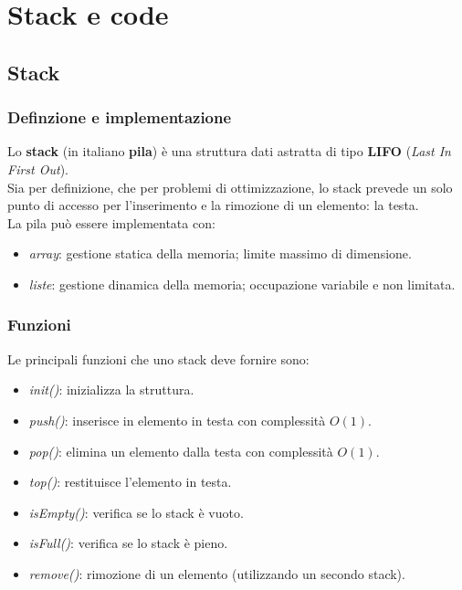 \chapter{Stack e code}

\section{Stack}
\subsection{Definzione e implementazione}
Lo \textbf{stack} (in italiano \textbf{pila}) è una struttura dati astratta di tipo \textbf{LIFO} (\textit{Last In First Out}).\\
Sia per definizione, che per problemi di ottimizzazione, lo stack prevede un solo punto di accesso per l'inserimento e la rimozione di un elemento: la testa.\\
La pila può essere implementata con:
\begin{itemize}[noitemsep, nolistsep]
	\item \textit{array}: gestione statica della memoria; limite massimo di dimensione.
	\item \textit{liste}: gestione dinamica della memoria; occupazione variabile e non limitata.
\end{itemize}

\subsection{Funzioni}
Le principali funzioni che uno stack deve fornire sono:
\begin{itemize}[noitemsep]
	\item \textit{init()}: inizializza la struttura.
	\item \textit{push()}: inserisce in elemento in testa con complessità $O(1)$.
	\item \textit{pop()}: elimina un elemento dalla testa con complessità $O(1)$.
	\item \textit{top()}: restituisce l'elemento in testa.
	\item \textit{isEmpty()}: verifica se lo stack è vuoto.
	\item \textit{isFull()}: verifica se lo stack è pieno.
	\item \textit{remove()}: rimozione di un elemento (utilizzando un secondo stack).
\end{itemize}

